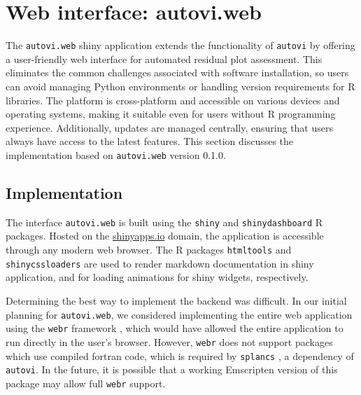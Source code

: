 \documentclass[
doublespace,
  times]{anzsauth}
\begin{document}
\section{Web interface: autovi.web}\label{sec-autovi-web}

The \texttt{autovi.web} shiny application extends the functionality of
\texttt{autovi} by offering a user-friendly web interface for automated
residual plot assessment. This eliminates the common challenges
associated with software installation, so users can avoid managing
Python environments or handling version requirements for R libraries.
The platform is cross-platform and accessible on various devices and
operating systems, making it suitable even for users without R
programming experience. Additionally, updates are managed centrally,
ensuring that users always have access to the latest features. This
section discusses the implementation based on \texttt{autovi.web}
version 0.1.0.

\subsection{Implementation}\label{implementation}

The interface \texttt{autovi.web} is built using the \texttt{shiny}
\citep{shiny} and \texttt{shinydashboard} \citep{shinydashboard} R
packages. Hosted on the \href{https://www.shinyapps.io}{shinyapps.io}
domain, the application is accessible through any modern web browser.
The R packages \texttt{htmltools} \citep{htmltools} and
\texttt{shinycssloaders} \citep{shinycssloaders} are used to render
markdown documentation in shiny application, and for loading animations
for shiny widgets, respectively.

Determining the best way to implement the backend was difficult. In our
initial planning for \texttt{autovi.web}, we considered implementing the
entire web application using the \texttt{webr} framework \citep{webr},
which would have allowed the entire application to run directly in the
user's browser. However, \texttt{webr} does not support packages which
use compiled fortran code, which is required by \texttt{splancs}
\citep{splancs}, a dependency of \texttt{autovi}. In the future, it is
possible that a working Emscripten \citep{zakai2011emscripten} version
of this package may allow full \texttt{webr} support.
\end{document}
